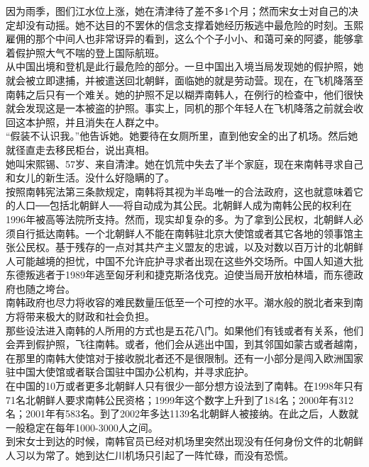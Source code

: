 因为雨季，图们江水位上涨，她在清津待了差不多1个月；然而宋女士对自己的决定却没有动摇。她不达目的不罢休的信念支撑着她经历叛逃中最危险的时刻。玉熙雇佣的那个中间人也非常讶异的看到，这么个个子小小、和蔼可亲的阿婆，能够拿着假护照大气不喘的登上国际航班。\\

从中国出境和登机是此行最危险的部分。一旦中国出入境当局发现她的假护照，她就会被立即逮捕，并被遣送回北朝鲜，面临她的就是劳动营。现在，在飞机降落至南韩之后只有一个难关。她的护照不足以糊弄南韩人，在例行的检查中，他们很快就会发现这是一本被盗的护照。事实上，同机的那个年轻人在飞机降落之前就会收回这本护照，并且消失在人群之中。\\

“假装不认识我。”他告诉她。她要待在女厕所里，直到他安全的出了机场。然后她就径直走去移民柜台，说出真相。\\

她叫宋熙锡、57岁、来自清津。她在饥荒中失去了半个家庭，现在来南韩寻求自己和女儿的新生活。没什么好隐瞒的了。\\

按照南韩宪法第三条款规定，南韩将其视为半岛唯一的合法政府，这也就意味着它的人口──包括北朝鲜人──将自动成为其公民。北朝鲜人成为南韩公民的权利在1996年被高等法院所支持。然而，现实却复杂的多。为了拿到公民权，北朝鲜人必须自行抵达南韩。一个北朝鲜人不能在南韩驻北京大使馆或者其它各地的领事馆主张公民权。基于残存的一点对其共产主义盟友的忠诚，以及对数以百万计的北朝鲜人可能越境的担忧，中国不允许庇护寻求者出现在这些外交场所。中国人知道大批东德叛逃者于1989年逃至匈牙利和捷克斯洛伐克。迫使当局开放柏林墙，而东德政府也随之垮台。\\

南韩政府也尽力将收容的难民数量压低至一个可控的水平。潮水般的脱北者来到南方将带来极大的财政和社会负担。\\

那些设法进入南韩的人所用的方式也是五花八门。如果他们有钱或者有关系，他们会弄到假护照，飞往南韩。或者，他们会从逃出中国，到其邻国如蒙古或者越南，在那里的南韩大使馆对于接收脱北者还不是很限制。还有一小部分是闯入欧洲国家驻中国大使馆或者联合国驻中国办公机构，并寻求庇护。\\

在中国的10万或者更多北朝鲜人只有很少一部分想方设法到了南韩。在1998年只有71名北朝鲜人要求南韩公民资格；1999年这个数字上升到了184名；2000年有312名；2001年有583名。到了2002年多达1139名北朝鲜人被接纳。在此之后，人数就一般稳定在每年1000-3000人之间。\\

到宋女士到达的时候，南韩官员已经对机场里突然出现没有任何身份文件的北朝鲜人习以为常了。她到达仁川机场只引起了一阵忙碌，而没有恐慌。\\

